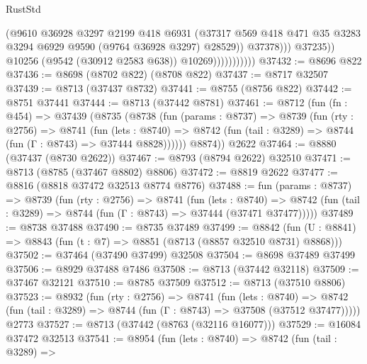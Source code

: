 \begin{lexlean}{RustStd}
\begin{coremodule}
                                    (@9610
                                      @36928
                                      @3297
                                      @2199
                                      @418
                                      @6931
                                      (@37317
                                        @569
                                        @418
                                        @471
                                        @35
                                        @3283
                                        @3294
                                        @6929
                                        @9590
                                        (@9764 @36928 @3297)
                                        @28529))
                                    @37378)))
                              @37235))
                          @10256
                          (@9542 (@30912 @2583 @638))
                          @10269)))))))))))
@37432 := @8696 @822
@37436 := @8698 (@8702 @822) (@8708 @822)
@37437 := @8717 @32507
@37439 := @8713 (@37437 @8732)
@37441 := @8755 (@8756 @822)
@37442 := @8751 @37441
@37444 := @8713 (@37442 @8781)
@37461 := @8712
    (fun (fn : @454) =>
    @37439
      (@8735
        (@8738
          (fun (params : @8737) =>
          @8739
            (fun (rty : @2756) =>
            @8741
              (fun (lets : @8740) =>
              @8742 (fun (tail : @3289) => @8744 (fun (Γ : @8743) => @37444 @8828))))))
        @8874))
    @2622
@37464 := @8880 (@37437 (@8730 @2622))
@37467 := @8793 (@8794 @2622) @32510
@37471 := @8713 (@8785 (@37467 @8802) @8806)
@37472 := @8819 @2622
@37477 := @8816 (@8818 @37472 @32513 @8774 @8776)
@37488 := fun (params : @8737) =>
  @8739
    (fun (rty : @2756) =>
    @8741
      (fun (lets : @8740) =>
      @8742 (fun (tail : @3289) => @8744 (fun (Γ : @8743) => @37444 (@37471 @37477)))))
@37489 := @8738 @37488
@37490 := @8735 @37489
@37499 := @8842
    (fun (U : @8841) => @8843 (fun (t : @7) => @8851 (@8713 (@8857 @32510 @8731) @8868)))
@37502 := @37464 (@37490 @37499) @32508
@37504 := @8698 @37489 @37499
@37506 := @8929 @37488 @7486
@37508 := @8713 (@37442 @32118)
@37509 := @37467 @32121
@37510 := @8785 @37509
@37512 := @8713 (@37510 @8806)
@37523 := @8932
    (fun (rty : @2756) =>
    @8741
      (fun (lets : @8740) =>
      @8742 (fun (tail : @3289) => @8744 (fun (Γ : @8743) => @37508 (@37512 @37477)))))
    @2773
@37527 := @8713 (@37442 (@8763 (@32116 @16077)))
@37529 := @16084 @37472 @32513
@37541 := @8954
    (fun (lets : @8740) =>
    @8742
      (fun (tail : @3289) =>

\end{coremodule}
\end{lexlean}
